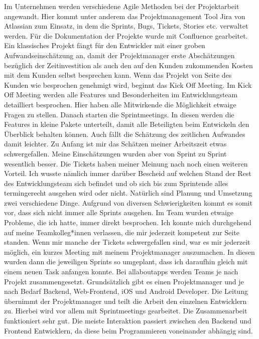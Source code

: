Im Unternehmen werden verschiedene Agile Methoden bei der Projektarbeit angewandt. Hier kommt unter anderem das Projektmanagement Tool Jira von Atlassian zum Einsatz, in dem die Sprints, Bugs, Tickets, Stories etc. verwaltet werden. Für die Dokumentation der Projekte wurde mit Confluence gearbeitet. \newline
Ein klassisches Projekt fängt für den Entwickler mit einer groben Aufwandseinschätzung an, damit der Projektmanager erste Abschätzungen bezüglich der Zeitinvestition als auch den auf den Kunden zukommenden Kosten mit dem Kunden selbst besprechen kann. Wenn das Projekt von Seite des Kunden wie besprochen genehmigt wird, beginnt das Kick Off Meeting. Im Kick Off Meeting werden alle Features und Besonderheiten im Entwicklungsteam detailliert besprochen. Hier haben alle Mitwirkende die Möglichkeit etwaige Fragen zu stellen. Danach starten die Sprintmeetings. In diesen werden die Features in kleine Pakete unterteilt, damit alle Beteiligten beim Entwickeln den Überblick behalten können. Auch fällt die Schätzung des zeitlichen Aufwandes damit leichter. Zu Anfang ist mir das Schätzen meiner Arbeitszeit etwas schwergefallen. Meine Einschätzungen wurden aber von Sprint zu Sprint wesentlich besser. Die Tickets haben meiner Meinung nach noch einen weiteren Vorteil. Ich wusste nämlich immer darüber Bescheid auf welchen Stand der Rest des Entwicklungsteam sich befindet und ob sich bis zum Sprintende alles termingerecht ausgehen wird oder nicht. Natürlich sind Planung und Umsetzung zwei verschiedene Dinge. Aufgrund von diversen Schwierigkeiten kommt es somit vor, dass sich nicht immer alle Sprints ausgehen. Im Team wurden etwaige Probleme, die ich hatte, immer direkt besprochen. Ich konnte mich durchgehend auf meine Teamkolleg*innen verlassen, die mir jederzeit kompetent zur Seite standen. Wenn mir manche der Tickets schwergefallen sind, war es mir jederzeit möglich, ein kurzes Meeting mit meinem Projektmanager auszumachen. In diesen wurden dann die jeweiligen Sprints so umgeplant, dass ich daraufhin gleich mit einem neuen Task anfangen konnte.\newline
Bei allaboutapps werden Teams je nach Projekt zusammengesetzt. Grundsätzlich gibt es einen Projektmanager und je nach Bedarf Backend, Web-Frontend, iOS und Android Developer. Die Leitung übernimmt der Projektmanager und teilt die Arbeit den einzelnen Entwicklern zu. Hierbei wird vor allem mit Sprintmeetings gearbeitet. Die Zusammenarbeit funktioniert sehr gut. Die meiste Interaktion passiert zwischen den Backend und Frontend Entwicklern, da diese beim Programmieren voneinander abhängig sind.

